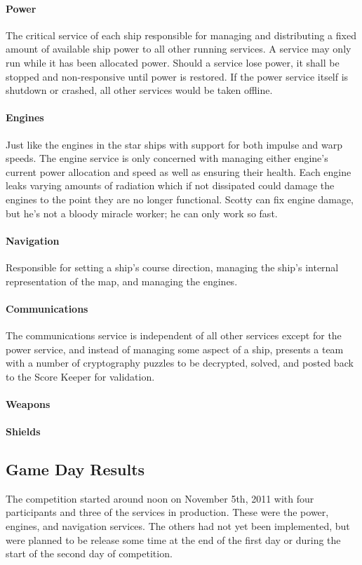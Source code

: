 \documentclass[10pt]{article}
\begin{document}
\paragraph{Power} The critical service of each ship responsible for managing and
distributing a fixed amount of available ship power to all other running
services. A service may only run while it has been allocated power. Should a
service lose power, it shall be stopped and non-responsive until power is
restored. If the power service itself is shutdown or crashed, all other
services would be taken offline.

\paragraph{Engines} Just like the engines in the star ships with support for
both impulse and warp speeds. The engine service is only concerned with
managing either engine's current power allocation and speed as well as ensuring
their health. Each engine leaks varying amounts of radiation which if not
dissipated could damage the engines to the point they are no longer functional.
Scotty can fix engine damage, but he's not a bloody miracle worker; he can only
work so fast.

\paragraph{Navigation} Responsible for setting a ship's course direction,
managing the ship's internal representation of the map, and managing the
engines.

\paragraph{Communications} The communications service is independent of all
other services except for the power service, and instead of managing some
aspect of a ship, presents a team with a number of cryptography puzzles to be
decrypted, solved, and posted back to the Score Keeper for validation.

\paragraph{Weapons}

\paragraph{Shields}

\subsection{Game Day Results}
The competition started around noon on November 5th, 2011 with four participants
and three of the services in production. These were the power, engines, and
navigation services. The others had not yet been implemented, but were planned
to be release some time at the end of the first day or during the start of the
second day of competition.
\end{document}
